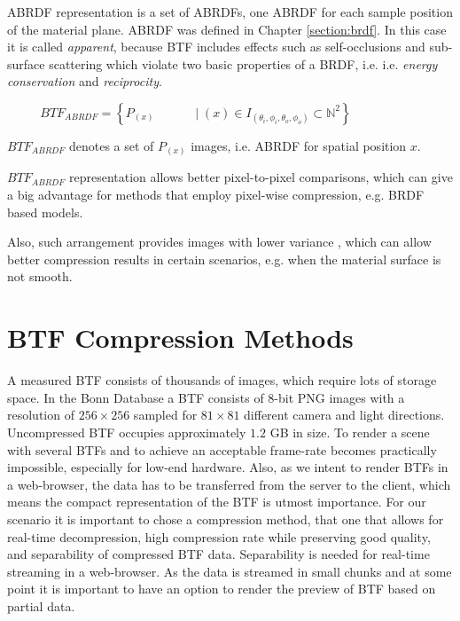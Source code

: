  ABRDF representation is a set of ABRDFs, one ABRDF for each sample position of the material plane. 
 ABRDF was defined in Chapter \ref{section:brdf}. In this case it is called \emph{apparent}, 
 because BTF includes effects such as self-occlusions and sub-surface scattering which violate two basic properties of a BRDF, i.e. i.e. \emph{energy conservation} and \emph{reciprocity}.
 
 {\centering $\,\,\,\,\,\,\,\,\,\,\,\,\,\,\,\,BTF_{ABRDF}=\left \{P_{(x) } \,\,\,\,\,\,\,\,\,\,\,\,\,\,\,\,\,\,\mid  (x)\in I_{(\theta_{i} ,\phi_{i},\theta_{o} ,\phi_{o})}\subset \mathbb{N}^{2}\right \}$ \\}
 
 $BTF_{ABRDF}$ denotes a set of $P_{(x)}$ images, i.e. ABRDF for spatial position $x$.


 $BTF_{ABRDF}$ representation allows better pixel-to-pixel comparisons, which can give a big advantage for methods that employ pixel-wise compression, e.g. BRDF based models.

Also, such arrangement provides images with lower variance \cite{haindl}, which can allow better compression results in certain scenarios, e.g. when the material surface is not smooth.

 
\section{BTF Compression Methods}
\label{chapter:compression_methods}



 A measured BTF consists of thousands of images, which require lots of storage space.
In the Bonn  Database \cite{btfBonn} a BTF consists of 8-bit PNG images with a resolution of $256\times256$ sampled for $81\times81$ different camera and light directions.
  Uncompressed BTF occupies approximately $1.2$ GB in size.
 To render a scene with several BTFs and to achieve an acceptable frame-rate becomes practically impossible, especially for low-end hardware.
 Also, as we intent to render BTFs in a web-browser, the data has to be transferred from the server to the client, which means the compact representation of the BTF is utmost importance.
 For our scenario it is important to chose a compression method, that one that allows for real-time decompression, high compression rate while preserving good quality, and separability of compressed BTF data.
 Separability is needed for real-time streaming in a web-browser.  
 As the data is streamed in small chunks and at some point it is important to have an option to render the preview of BTF based on partial data.

